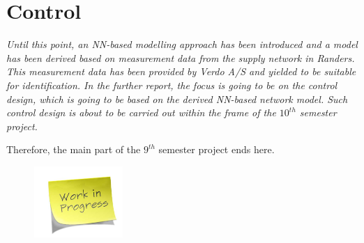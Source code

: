 \chapter{Control}
\label{unspecified}

\emph{Until this point, an NN-based modelling approach has been introduced and a model has been derived based on measurement data from the supply network in Randers. This measurement data has been provided by Verdo A/S and yielded to be suitable for identification. In the further report, the focus is going to be on the control design, which is going to be based on the derived NN-based network model. Such control design is about to be carried out within the frame of the $10^{th}$ semester project.}

Therefore, the main part of the $9^{th}$ semester project ends here. 

\begin{figure}[H]
\centering
\includegraphics[width=0.3\textwidth]{report/pictures/missingfigure}
\end{figure}